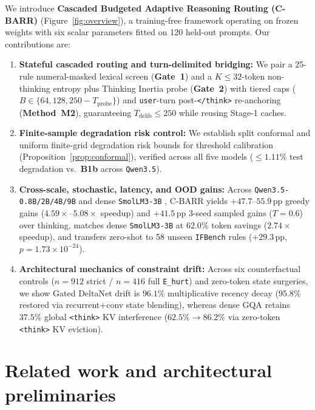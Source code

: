 \documentclass{article}
\begin{document}
We introduce \textbf{Cascaded Budgeted Adaptive Reasoning Routing (C-BARR)} (Figure~\ref{fig:overview}), a training-free framework operating on frozen weights with six scalar parameters fitted on 120 held-out prompts. Our contributions are:
\begin{enumerate}
    \item \textbf{Stateful cascaded routing and turn-delimited bridging:} We pair a 25-rule numeral-masked lexical screen (\textbf{Gate~1}) and a $K \le 32$-token non-thinking entropy plus Thinking Inertia probe (\textbf{Gate~2}) with tiered caps ($B \in \{64, 128, 250 - T_{\text{probe}}\}$) and \texttt{user}-turn post-\texttt{</think>} re-anchoring (\textbf{Method~M2}), guaranteeing $T_{\text{delib}} \le 250$ while reusing Stage-1 caches.
    \item \textbf{Finite-sample degradation risk control:} We establish split conformal and uniform finite-grid degradation risk bounds for threshold calibration (Proposition~\ref{prop:conformal}), verified across all five models ($\le 1.11\%$ test degradation vs.\ \textbf{B1b} across \texttt{Qwen3.5}).
    \item \textbf{Cross-scale, stochastic, latency, and OOD gains:} Across \texttt{Qwen3.5-0.8B/2B/4B/9B} and dense \texttt{SmolLM3-3B} \cite{benallal2025smollm3}, C-BARR yields $+47.7$--$55.9$\,pp greedy gains ($4.59\times$--$5.08\times$ speedup) and $+41.5$\,pp 3-seed sampled gains ($T=0.6$) over thinking, matches dense \texttt{SmolLM3-3B} at $62.0\%$ token savings ($2.74\times$ speedup), and transfers zero-shot to 58 unseen \texttt{IFBench} rules ($+29.3$\,pp, $p = 1.73 \times 10^{-24}$).
    \item \textbf{Architectural mechanics of constraint drift:} Across six counterfactual controls ($n=912$ strict / $n=416$ full \texttt{E\_hurt}) and zero-token state surgeries, we show Gated DeltaNet drift is $96.1\%$ multiplicative recency decay ($95.8\%$ restored via recurrent+conv state blending), whereas dense GQA retains $37.5\%$ global \texttt{<think>} KV interference ($62.5\% \to 86.2\%$ via zero-token \texttt{<think>} KV eviction).
\end{enumerate}

\section{Related work and architectural preliminaries}
\label{sec:related}
\end{document}
